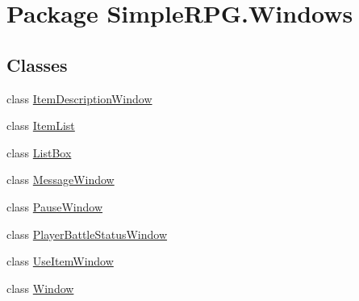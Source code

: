 \hypertarget{namespace_simple_r_p_g_1_1_windows}{\section{Package Simple\+R\+P\+G.\+Windows}
\label{namespace_simple_r_p_g_1_1_windows}
}
\subsection*{Classes}
\begin{DoxyCompactItemize}
\item 
class \hyperlink{class_simple_r_p_g_1_1_windows_1_1_item_description_window}{Item\+Description\+Window}
\item 
class \hyperlink{class_simple_r_p_g_1_1_windows_1_1_item_list}{Item\+List}
\item 
class \hyperlink{class_simple_r_p_g_1_1_windows_1_1_list_box}{List\+Box}
\item 
class \hyperlink{class_simple_r_p_g_1_1_windows_1_1_message_window}{Message\+Window}
\item 
class \hyperlink{class_simple_r_p_g_1_1_windows_1_1_pause_window}{Pause\+Window}
\item 
class \hyperlink{class_simple_r_p_g_1_1_windows_1_1_player_battle_status_window}{Player\+Battle\+Status\+Window}
\item 
class \hyperlink{class_simple_r_p_g_1_1_windows_1_1_use_item_window}{Use\+Item\+Window}
\item 
class \hyperlink{class_simple_r_p_g_1_1_windows_1_1_window}{Window}
\end{DoxyCompactItemize}
